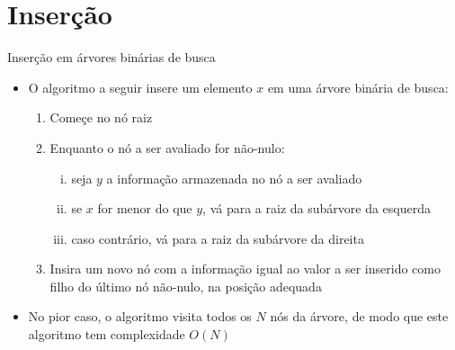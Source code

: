 \section{Inserção}

\begin{frame}[fragile]{Inserção em árvores binárias de busca}
    \begin{itemize}
	    \item O algoritmo a seguir insere um elemento $x$ em uma árvore binária de busca:

	\begin{enumerate}
		\item Começe no nó raiz

		\item Enquanto o nó a ser avaliado for não-nulo:

		\begin{enumerate}[i.]
            \item seja $y$ a informação armazenada no nó a ser avaliado

            \item se $x$ for menor do que $y$, vá para a raiz da subárvore da esquerda

            \item caso contrário, vá para a raiz da subárvore da direita
		\end{enumerate}

		\item Insira um novo nó com a informação igual ao valor a ser inserido como { filho} do último nó não-nulo, na posição adequada
	\end{enumerate}

        \item No pior caso, o algoritmo visita todos os $N$ nós da árvore, de modo que este algoritmo tem complexidade $O(N)$

    \end{itemize}
\end{frame} 

